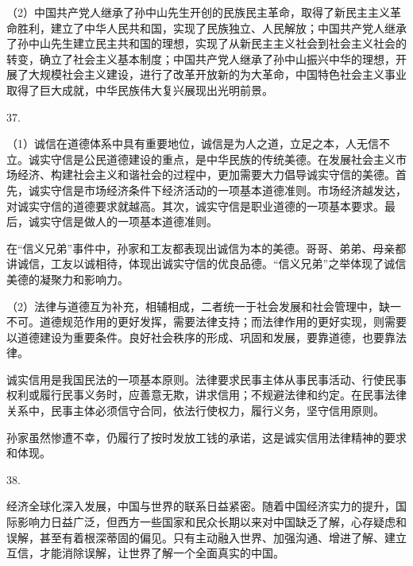\documentclass[a4paper]{article}
\begin{document}
（2）中国共产党人继承了孙中山先生开创的民族民主革命，取得了新民主主义革命胜利，建立了中华人民共和国，实现了民族独立、人民解放；中国共产党人继承了孙中山先生建立民主共和国的理想，实现了从新民主主义社会到社会主义社会的转变，确立了社会主义基本制度；中国共产党人继承了孙中山振兴中华的理想，开展了大规模社会主义建设，进行了改革开放新的为大革命，中国特色社会主义事业取得了巨大成就，中华民族伟大复兴展现出光明前景。

37.

（1）诚信在道德体系中具有重要地位，诚信是为人之道，立足之本，人无信不立。诚实守信是公民道德建设的重点，是中华民族的传统美德。在发展社会主义市场经济、构建社会主义和谐社会的过程中，更加需要大力倡导诚实守信的美德。首先，诚实守信是市场经济条件下经济活动的一项基本道德准则。市场经济越发达，对诚实守信的道德要求就越高。其次，诚实守信是职业道德的一项基本要求。最后，诚实守信是做人的一项基本道德准则。

在“信义兄弟”事件中，孙家和工友都表现出诚信为本的美德。哥哥、弟弟、母亲都讲诚信，工友以诚相待，体现出诚实守信的优良品德。“信义兄弟”之举体现了诚信美德的凝聚力和影响力。

（2）法律与道德互为补充，相辅相成，二者统一于社会发展和社会管理中，缺一不可。道德规范作用的更好发挥，需要法律支持；而法律作用的更好实现，则需要以道德建设为重要条件。良好社会秩序的形成、巩固和发展，要靠道德，也要靠法律。

诚实信用是我国民法的一项基本原则。法律要求民事主体从事民事活动、行使民事权利或履行民事义务时，应善意无欺，讲求信用；不规避法律和约定。在民事法律关系中，民事主体必须信守合同，依法行使权力，履行义务，坚守信用原则。

孙家虽然惨遭不幸，仍履行了按时发放工钱的承诺，这是诚实信用法律精神的要求和体现。

38.

经济全球化深入发展，中国与世界的联系日益紧密。随着中国经济实力的提升，国际影响力日益广泛，但西方一些国家和民众长期以来对中国缺乏了解，心存疑虑和误解，甚至有着根深蒂固的偏见。只有主动融入世界、加强沟通、增进了解、建立互信，才能消除误解，让世界了解一个全面真实的中国。
\end{document}
